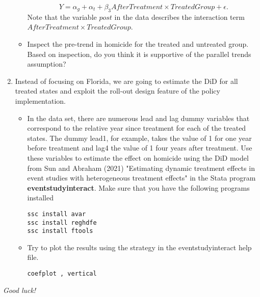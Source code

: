 \documentclass[12pt]{article}
\begin{document}
\begin{enumerate}
\begin{itemize}
\begin{equation}
Y = \alpha_g + \alpha_{t} + \beta_3 AfterTreatment \times TreatedGroup + \epsilon.
    \end{equation}
Note that the variable $post$ in the data describes the interaction term $AfterTreatment \times TreatedGroup$.
\item Inspect the pre-trend in homicide for the treated and untreated group. Based on inspection, do you think it is supportive of the parallel trends assumption? 
\end{itemize}
\item Instead of focusing on Florida, we are going to estimate the DiD for all treated states and exploit the roll-out design feature of the policy implementation.
\begin{itemize}
\item In the data set, there are numerous lead and lag dummy variables that correspond to the relative year since treatment for each of the treated states. The dummy lead1, for example, takes the value of 1 for one year before treatment and lag4 the value of 1 four years after treatment. Use these variables to estimate the effect on homicide using the DiD model from Sun and Abraham (2021) "Estimating dynamic treatment effects in event studies with heterogeneous treatment effects" in the Stata program \textbf{eventstudyinteract}. Make sure that you have the following programs installed
\begin{verbatim}
ssc install avar
ssc install reghdfe
ssc install ftools
\end{verbatim}

\item Try to plot the results using the strategy in the eventstudyinteract help file.

\begin{verbatim}
coefplot , vertical
\end{verbatim}
\end{itemize}

\end{enumerate}

\emph{Good luck!}


 
\end{document}
